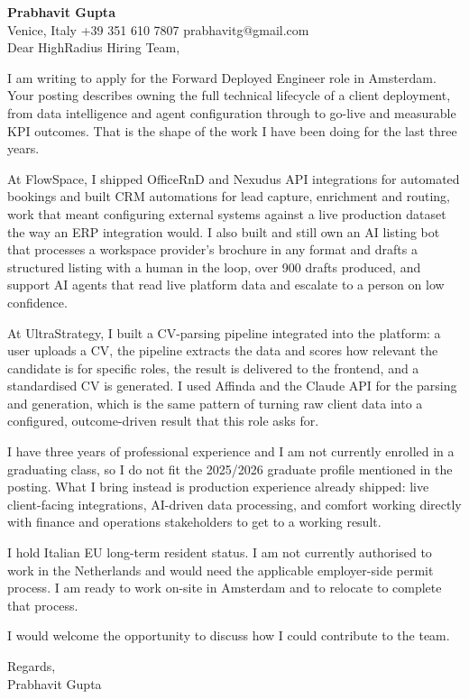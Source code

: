 \documentclass[a4paper,10.5pt]{article}
\begin{document}
\textbf{Prabhavit Gupta}\\
Venice, Italy \textbar{} +39 351 610 7807 \textbar{} prabhavitg@gmail.com\\[10pt]
Dear HighRadius Hiring Team,

I am writing to apply for the Forward Deployed Engineer role in Amsterdam. Your posting describes owning the full technical lifecycle of a client deployment, from data intelligence and agent configuration through to go-live and measurable KPI outcomes. That is the shape of the work I have been doing for the last three years.

At FlowSpace, I shipped OfficeRnD and Nexudus API integrations for automated bookings and built CRM automations for lead capture, enrichment and routing, work that meant configuring external systems against a live production dataset the way an ERP integration would. I also built and still own an AI listing bot that processes a workspace provider's brochure in any format and drafts a structured listing with a human in the loop, over 900 drafts produced, and support AI agents that read live platform data and escalate to a person on low confidence.

At UltraStrategy, I built a CV-parsing pipeline integrated into the platform: a user uploads a CV, the pipeline extracts the data and scores how relevant the candidate is for specific roles, the result is delivered to the frontend, and a standardised CV is generated. I used Affinda and the Claude API for the parsing and generation, which is the same pattern of turning raw client data into a configured, outcome-driven result that this role asks for.

I have three years of professional experience and I am not currently enrolled in a graduating class, so I do not fit the 2025/2026 graduate profile mentioned in the posting. What I bring instead is production experience already shipped: live client-facing integrations, AI-driven data processing, and comfort working directly with finance and operations stakeholders to get to a working result.

I hold Italian EU long-term resident status. I am not currently authorised to work in the Netherlands and would need the applicable employer-side permit process. I am ready to work on-site in Amsterdam and to relocate to complete that process.

I would welcome the opportunity to discuss how I could contribute to the team.

Regards,\\
Prabhavit Gupta
\end{document}
